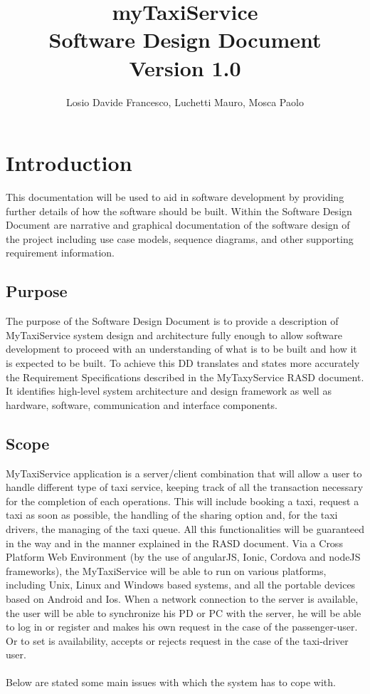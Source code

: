 \documentclass[10pt,a4paper]{report}
\author{Losio Davide Francesco, Luchetti Mauro, Mosca Paolo}
\title{myTaxiService\\Software Design Document\\ Version 1.0}
\begin{document}
\maketitle
\tableofcontents
\chapter{Introduction}
This documentation will be used to aid in software development by providing further details of how the software should be built. Within the Software Design Document are narrative and graphical documentation of the software design of the project including use case models, sequence diagrams, and other supporting requirement information.

\section{Purpose}

The purpose of the Software Design Document is to provide a description of MyTaxiService system design and architecture fully enough to allow software development to proceed with an understanding of what is to be built and how it is expected to be built. To achieve this DD translates and states more accurately the Requirement Specifications described in the MyTaxyService RASD document. It identifies high-level system architecture and design framework as well as hardware, software, communication and interface components.

\section{Scope}

MyTaxiService application is a server/client combination that will allow a user to handle different type of taxi service, keeping track of all the transaction necessary for the completion of each operations. This will include booking a taxi, request a taxi as soon as possible, the handling of the sharing option and, for the taxi drivers, the managing of the taxi queue. All this functionalities will be guaranteed in the way and in the manner explained in the RASD document. Via a Cross Platform Web Environment (by the use of angularJS, Ionic, Cordova and nodeJS frameworks), the MyTaxiService will be able to run on various platforms, including Unix, Linux and Windows based systems, and all the portable devices based on Android and Ios. When a network connection to the server is available, the user will be able to synchronize his PD or PC with the server, he will be able to log in or register and makes his own request in the case of the passenger-user. Or to set is availability, accepts or rejects request in the case of the taxi-driver user.\\\\
Below are stated some main issues with which the system has to cope with.
\end{document}
